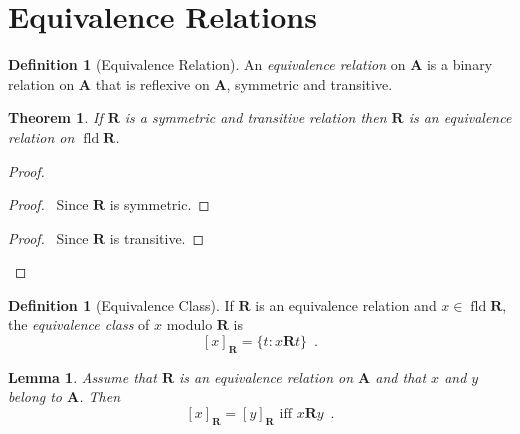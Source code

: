 \documentclass{article}
\let\qed\relax
\newtheorem{lemma}[axiom]{Lemma}
\newtheorem{theorem}[axiom]{Theorem}
\theoremstyle{definition}
\newtheorem{definition}[axiom]{Definition}
\newcommand{\fld}{\ensuremath{\operatorname{fld}}}
\begin{document}
    \section{Equivalence Relations}

    \begin{definition}[Equivalence Relation]
        An \emph{equivalence relation} on $\mathbf{A}$ is a binary relation on $\mathbf{A}$
        that is reflexive on $\mathbf{A}$, symmetric and transitive.
    \end{definition}

    \begin{theorem}
        If $\mathbf{R}$ is a symmetric and transitive relation then $\mathbf{R}$ is an equivalence relation
        on $\fld \mathbf{R}$.
    \end{theorem}

    \begin{proof}
        \pf
        \step{1}{\pflet{$x \in \fld \mathbf{R}$}}
        \begin{proof}
            \pf\ Since $\mathbf{R}$ is symmetric.
        \end{proof}
        \begin{proof}
            \pf\ Since $\mathbf{R}$ is transitive.
        \end{proof}
        \qed
    \end{proof}

    \begin{definition}[Equivalence Class]
        If $\mathbf{R}$ is an equivalence relation and $x \in \fld \mathbf{R}$, the \emph{equivalence class}
        of $x$ modulo $\mathbf{R}$ is
        \[ [x]_{\mathbf{R}} = \{ t : x \mathbf{R} t \} \enspace . \]
    \end{definition}

    \begin{lemma}
        Assume that $\mathbf{R}$ is an equivalence relation on $\mathbf{A}$ and that $x$ and $y$ belong to
        $\mathbf{A}$. Then
        \[ [x]_{\mathbf{R}} = [y]_{\mathbf{R}} \text{ iff } x \mathbf{R} y \enspace . \]
    \end{lemma}
\end{document}
